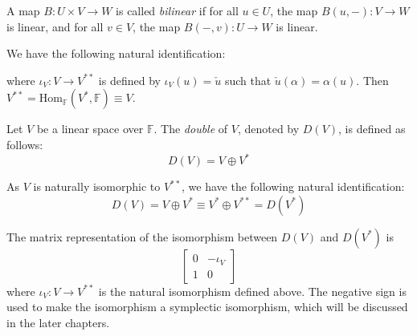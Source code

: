 \documentclass[
	11pt, %
	fleqn, %
	a4paper, %
]{LegrandOrangeBook}
\newcommand{\Hom}{\text{Hom}} %
\newcommand{\F}{\mathbb{F}} %
\newcommand{\vequiv}{\rotatebox{90}{$\equiv$}}
\begin{document}
\begin{definition}
    A map $B : U \times V \to W$ is called \emph{bilinear} if for all $u \in U$, the map $B(u, -) : V \to W$ is linear, and for all $v \in V$, the map $B(-, v) : U \to W$ is linear.
\end{definition}

We have the following natural identification:
\begin{center}
\end{center}
where $\iota_V : V \to V^{**}$ is defined by $\iota_V(u) = \check{u}$ such that $\check{u}(\alpha) = \alpha(u)$. Then $V^{**} = \Hom_{\F}(V^*, \F) \equiv V$.

\begin{definition}[Doubles]
    Let $V$ be a linear space over $\F$. The \emph{double} of $V$, denoted by $D(V)$, is defined as follows:
    \[
        D(V) = V \oplus V^*
    \]
\end{definition}

As $V$ is naturally isomorphic to $V^{**}$, we have the following natural identification:
\[
    D(V) = V \oplus V^* \equiv V^* \oplus V^{**} = D(V^*)
\]

\begin{remark}
    The matrix representation of the isomorphism between $D(V)$ and $D(V^*)$ is
    \[
        \begin{bmatrix}
            0 & -\iota_V \\
            1 & 0
        \end{bmatrix}
    \]
    where $\iota_V : V \to V^{**}$ is the natural isomorphism defined above. The negative sign is used to make the isomorphism a symplectic isomorphism, which will be discussed in the later chapters.
\end{remark}
\end{document}
